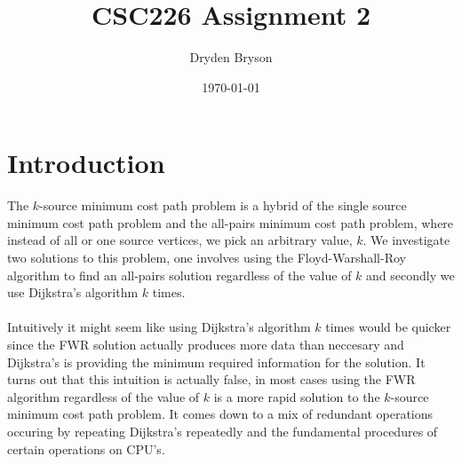 \documentclass{article}
\title{CSC226 Assignment 2}
\author{Dryden Bryson}
\date{\today}
\begin{document}
\maketitle
\newpage
\section*{Introduction}
The $k$-source minimum cost path problem is a hybrid of the single source minimum cost path problem and the all-pairs minimum cost path problem, where instead of all or one source vertices, we pick an arbitrary value, $k$. We investigate two solutions to this problem, one involves using the Floyd-Warshall-Roy algorithm to find an all-pairs solution regardless of the value of $k$ and secondly we use Dijkstra's algorithm $k$ times.\\\\
Intuitively it might seem like using Dijkstra's algorithm $k$ times would be quicker since the FWR solution actually produces more data than neccesary and Dijkstra's is providing the minimum required information for the solution. It turns out that this intuition is actually false, in most cases using the FWR algorithm regardless of the value of $k$ is a more rapid solution to the $k$-source minimum cost path problem. It comes down to a mix of redundant operations occuring by repeating Dijkstra's repeatedly and the fundamental procedures of certain operations on CPU's. 
\end{document}
